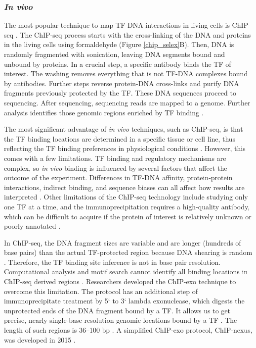       \subsubsection{\textit{In vivo}}

      The most popular technique to map TF-DNA interactions in living cells is \ac{ChIP-seq} \cite{johnson2007genome}. The ChIP-seq process starts with the cross-linking of the DNA and proteins in the living cells using formaldehyde ({Figure \ref{chip_selex}}B). Then, DNA is randomly fragmented with sonication, leaving DNA segments bound and unbound by proteins. In a crucial step, a specific antibody binds the TF of interest. The washing removes everything that is not TF-DNA complexes bound by antibodies. Further steps reverse protein-DNA cross-links and purify DNA fragments previously protected by the TF. These DNA sequences proceed to sequencing. After sequencing, sequencing reads are mapped to a genome. Further analysis identifies those genomic regions enriched by TF binding \cite{johnson2007genome,park2009chip}.

      The most significant advantage of \textit{in vivo} techniques, such as ChIP-seq, is that the TF binding locations are determined in a specific tissue or cell line, thus reflecting the TF binding preferences in physiological conditions \cite{park2009chip}. However, this comes with a few limitations. TF binding and regulatory mechanisms are complex, so \textit{in vivo} binding is influenced by several factors that affect the outcome of the experiment. Differences in TF-DNA affinity, protein-protein interactions, indirect binding, and sequence biases can all affect how results are interpreted \cite{jolma2010multiplexed,rhee2011comprehensive,rossi2018simplified}. Other limitations of the ChIP-seq technology include studying only one TF at a time, and the immunoprecipitation requires a high-quality antibody, which can be difficult to acquire if the protein of interest is relatively unknown or poorly annotated \cite{park2009chip}.

      In ChIP-seq, the DNA fragment sizes are variable and are longer (hundreds of base pairs) than the actual TF-protected region because DNA shearing is random \cite{welch2017data,rhee2011comprehensive}. Therefore, the TF binding site inference is not in base pair resolution. Computational analysis and motif search cannot identify all binding locations in ChIP-seq derived regions \cite{rhee2011comprehensive,yeh2022chip}. Researchers developed the ChIP-exo technique to overcome this limitation. The protocol has an additional step of immunoprecipitate treatment by 5` to 3` lambda exonuclease, which digests the unprotected ends of the DNA fragment bound by a TF. It allows us to get precise, nearly single-base resolution genomic locations bound by a TF \cite{rhee2011comprehensive,yeh2022chip}. The length of such regions is 36--100 bp \cite{welch2017data}. A simplified ChIP-exo protocol, ChIP-nexus, was developed in 2015 \cite{rossi2018simplified,welch2017data}.

